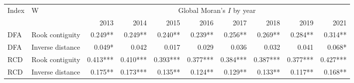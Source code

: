 \begin{tabular}{llrrrrrrrr}
\toprule
Index & W & \multicolumn{8}{c}{Global Moran's $I$ by year} \\
\cmidrule(lr){3-10}
 & & 2013 & 2014 & 2015 & 2016 & 2017 & 2018 & 2019 & 2021 \\
\midrule
DFA & Rook contiguity & 0.249** & 0.249** & 0.240** & 0.239** & 0.256** & 0.269** & 0.284** & 0.314** \\
DFA & Inverse distance & 0.049* & 0.042 & 0.017 & 0.029 & 0.036 & 0.032 & 0.041 & 0.068* \\
\midrule
RCD & Rook contiguity & 0.413*** & 0.410*** & 0.393*** & 0.377*** & 0.384*** & 0.387*** & 0.377*** & 0.427*** \\
RCD & Inverse distance & 0.175** & 0.173*** & 0.135** & 0.124** & 0.129** & 0.133** & 0.117** & 0.168** \\
\bottomrule
\end{tabular}